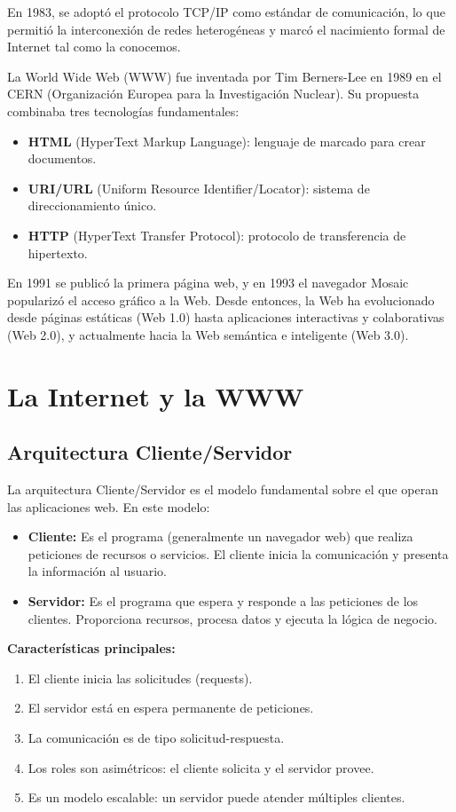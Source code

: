 \documentclass[12pt,letterpaper]{article}
\begin{document}
En 1983, se adopt\'o el protocolo TCP/IP como est\'andar de comunicaci\'on, lo que permiti\'o la interconexi\'on de redes heterog\'eneas y marc\'o el nacimiento formal de Internet tal como la conocemos.

La World Wide Web (WWW) fue inventada por Tim Berners-Lee en 1989 en el CERN (Organizaci\'on Europea para la Investigaci\'on Nuclear). Su propuesta combinaba tres tecnolog\'ias fundamentales:
\begin{itemize}
    \item \textbf{HTML} (HyperText Markup Language): lenguaje de marcado para crear documentos.
    \item \textbf{URI/URL} (Uniform Resource Identifier/Locator): sistema de direccionamiento \'unico.
    \item \textbf{HTTP} (HyperText Transfer Protocol): protocolo de transferencia de hipertexto.
\end{itemize}

En 1991 se public\'o la primera p\'agina web, y en 1993 el navegador Mosaic populariz\'o el acceso gr\'afico a la Web. Desde entonces, la Web ha evolucionado desde p\'aginas est\'aticas (Web 1.0) hasta aplicaciones interactivas y colaborativas (Web 2.0), y actualmente hacia la Web sem\'antica e inteligente (Web 3.0).

\section{La Internet y la WWW}

\subsection{Arquitectura Cliente/Servidor}

La arquitectura Cliente/Servidor es el modelo fundamental sobre el que operan las aplicaciones web. En este modelo:

\begin{itemize}
    \item \textbf{Cliente:} Es el programa (generalmente un navegador web) que realiza peticiones de recursos o servicios. El cliente inicia la comunicaci\'on y presenta la informaci\'on al usuario.
    \item \textbf{Servidor:} Es el programa que espera y responde a las peticiones de los clientes. Proporciona recursos, procesa datos y ejecuta la l\'ogica de negocio.
\end{itemize}

\textbf{Caracter\'isticas principales:}
\begin{enumerate}
    \item El cliente inicia las solicitudes (requests).
    \item El servidor est\'a en espera permanente de peticiones.
    \item La comunicaci\'on es de tipo solicitud-respuesta.
    \item Los roles son asim\'etricos: el cliente solicita y el servidor provee.
    \item Es un modelo escalable: un servidor puede atender m\'ultiples clientes.
\end{enumerate}
\end{document}
